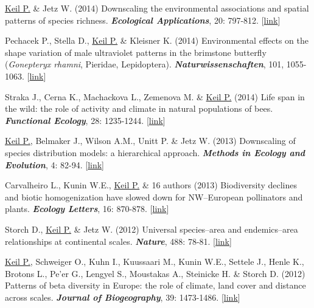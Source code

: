 \begin{etaremune}
\item \underline{Keil P.} \& Jetz W. (2014) Downscaling the environmental associations and spatial patterns of species richness. \textit{\textbf{Ecological Applications}}, 20: 797-812. [\href{http://www.esajournals.org/doi/abs/10.1890/13-0805.1?af=R&}{link}] 

\item Pechacek P., Stella D., \underline{Keil P.} \& Kleisner K. (2014) Environmental effects on the shape variation of male ultraviolet patterns in the brimstone butterfly (\textit{Gonepteryx rhamni}, Pieridae, Lepidoptera). \textit{\textbf{Naturwissenschaften}}, 101, 1055-1063.  [\href{http://link.springer.com/article/10.1007/s00114-014-1244-5}{link}] 

\item Straka J., Cerna K., Machackova L., Zemenova M. \& \underline{Keil P.} (2014) Life span in the wild: the role of activity and climate in natural populations of bees. \textit{\textbf{Functional Ecology}}, 28: 1235-1244.
[\href{http://onlinelibrary.wiley.com/doi/10.1111/1365-2435.12261/abstract}{link}]

\item \underline{Keil P.}, Belmaker J., Wilson A.M., Unitt P. \& Jetz W. (2013) Downscaling of species distribution models: a hierarchical approach. \textit{\textbf{Methods in Ecology and Evolution}}, 4: 82-94. [\href{http://onlinelibrary.wiley.com/doi/10.1111/j.2041-210x.2012.00264.x/abstract}{link}]

\item Carvalheiro L., Kunin W.E., \underline{Keil P.} \& 16 authors (2013) Biodiversity declines and biotic homogenization have slowed down for NW--European pollinators and plants. \textit{\textbf{Ecology Letters}}, 16: 870-878. [\href{http://onlinelibrary.wiley.com/doi/10.1111/ele.12121/abstract}{link}]

\item Storch D., \underline{Keil P.} \& Jetz W. (2012) Universal species--area and endemics--area relationships at continental scales. \textit{\textbf{Nature}}, 488: 78-81. [\href{http://www.nature.com/nature/journal/v488/n7409/full/nature11226.html}{link}]

\item \underline{Keil P.}, Schweiger O., Kuhn I., Kuussaari M., Kunin W.E., Settele J., Henle K., Brotons L., Pe’er G., Lengyel S., Moustakas A., Steinicke H. \& Storch D. (2012) Patterns of beta diversity in Europe: the role of climate, land cover and distance across scales. \textit{\textbf{Journal of Biogeography}}, 39: 1473-1486. [\href{http://onlinelibrary.wiley.com/doi/10.1111/j.1365-2699.2012.02701.x/abstract}{link}]


\end{etaremune}
